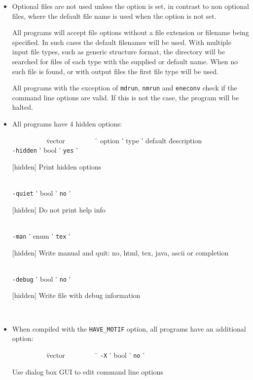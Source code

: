 \begin{itemize}
\item
Optional files are not used unless the option is set, in contrast to
non optional files, where the default file name is used when the
option is not set.

All {\gromacs} programs will accept file options without a file extension
or filename being specified. In such cases the default filenames will
be used. With multiple input file types, such as generic structure
format, the directory will be searched for files of each type with the
supplied or default name. When no such file is found, or with output
files the first file type will be used.

All {\gromacs} programs with the exception of {\tt mdrun},
{\tt nmrun} and {\tt eneconv} check if the command line options
are valid. If this is not the case, the program will be halted.

\item
All {\gromacs} programs have 4 hidden options:\\
\vspace{-5ex}
\begin{tabbing}
{\tt ~~~~~~~~~} \= vector \= {\tt ~~~~~~~~} \= \kill
\> option \'\> type \'\> default \' description \\
\> {\tt -hidden} \'\> bool \'\> {\tt    yes} \' \parbox[t]{0.7\linewidth}{[hidden] Print hidden options}\\
\> {\tt -quiet} \'\> bool \'\> {\tt     no} \' \parbox[t]{0.7\linewidth}{[hidden] Do not print help info}\\
\> {\tt -man} \'\> enum \'\> {\tt tex} \' \parbox[t]{0.7\linewidth}{[hidden] Write manual and quit: no, html, tex, java, ascii or completion}\\
\> {\tt -debug} \'\> bool \'\> {\tt     no} \' \parbox[t]{0.7\linewidth}{[hidden] Write file with debug information}\\
\end{tabbing}
\vspace{-5ex}

\item
When compiled with the {\tt HAVE\_MOTIF} option, all {\gromacs} programs
have an additional option:\\
\vspace{-5ex}
\begin{tabbing}
{\tt ~~~~~~~~~} \= vector \= {\tt ~~~~~~~~} \= \kill
\> {\tt -X} \'\> bool \'\> {\tt     no} \' \parbox[t]{0.7\linewidth}{Use dialog box GUI to edit command line options}\\
\end{tabbing}
\vspace{-5ex}


\end{itemize}
